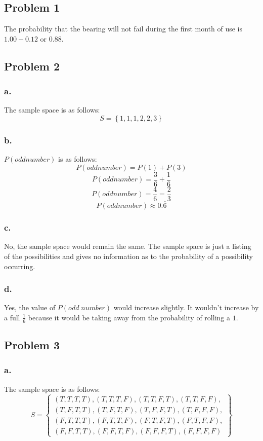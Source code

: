 \documentclass[11pt]{article}
\begin{document}
\subsection*{Problem 1}
The probability that the bearing will not fail during the first month of use is
$1.00 - 0.12$ or $0.88$. 

\subsection*{Problem 2}
\subsubsection*{a.}
The sample space is as follows:
\[ \textit{S} = \left\{ 1, 1, 1, 2, 2, 3 \right\} \]

\subsubsection*{b.}
$P(odd number)$ is as follows:
\[ P(odd number) = P(1) + P(3) \] 
\[ P(odd number) = \frac{3}{6} + \frac{1}{6} \]
\[ P(odd number) = \frac{4}{6} = \frac{2}{3} \]
\[ P(odd number) \approx 0.\overline{6} \]

\subsubsection*{c.}
No, the sample space would remain the same. The sample space is just a listing
of the possibilities and gives no information as to the probability of a
possibility occurring. 

\subsubsection*{d.}
Yes, the value of $P(odd\;number)$ would increase slightly. It wouldn't increase
by a full $\frac{1}{6}$ because it would be taking away from the probability of
rolling a $1$. 

\subsection*{Problem 3}
\subsubsection*{a.}
The sample space is as follows:
\[ \textit{S} = \left\{ 
    \begin{array}{c}
        \left( T, T, T, T \right),
        \left( T, T, T, F \right),
        \left( T, T, F, T \right),
        \left( T, T, F, F \right),\\
        \left( T, F, T, T \right),
        \left( T, F, T, F \right),
        \left( T, F, F, T \right),
        \left( T, F, F, F \right),\\
        \left( F, T, T, T \right),
        \left( F, T, T, F \right),
        \left( F, T, F, T \right),
        \left( F, T, F, F \right),\\
        \left( F, F, T, T \right),
        \left( F, F, T, F \right),
        \left( F, F, F, T \right),
        \left( F, F, F, F \right)
    \end{array}
\right\} \]
\end{document}
